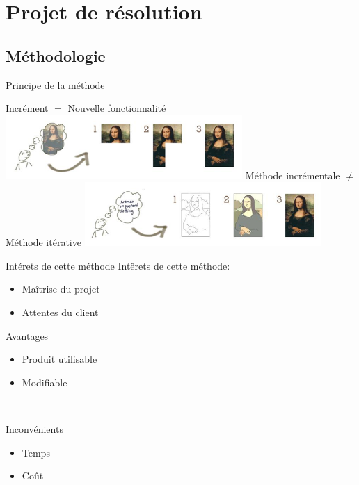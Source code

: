 \section{Projet de résolution}
\subsection{Méthodologie}
\begin{frame}{Principe de la méthode}
\begin{center}
	{Incrément $=$ Nouvelle fonctionnalité}\newline
	\includegraphics[width=9cm]{001.png} \newline
	\pause
	{Méthode incrémentale $\ne$ Méthode itérative}
	\includegraphics[width=9cm]{002.png}
\end{center}
\end{frame}
\begin{frame}{Intérets de cette méthode}
	Intêrets de cette méthode:
	\begin{itemize}
		\item Maîtrise du projet
		\item Attentes du client
	\end{itemize}
	
	\pause
	\begin{minipage}{4.4cm}
	\begin{exampleblock}{Avantages}
		\begin{itemize}
			\item Produit utilisable
			\item Modifiable
		\end{itemize}
	\end{exampleblock}
\end{minipage}
~ ~
	\begin{minipage}[r]{4.4cm}
	\begin{alertblock}{Inconvénients}
		\begin{itemize}
			\item Temps
			\item Coût
		\end{itemize}
	\end{alertblock}
\end{minipage}
\end{frame}

